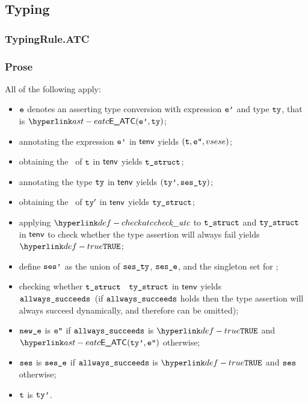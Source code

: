 \begin{mathpar}
\end{mathpar}

\subsection{Typing}
\subsubsection{TypingRule.ATC\label{sec:TypingRule.ATC}}
\subsubsection{Prose}
All of the following apply:
\begin{itemize}
  \item $\ve$ denotes an asserting type conversion with expression $\vep$ and type $\tty$, that is $\EATC(\vep, \tty)$;
  \item annotating the expression $\vep$ in $\tenv$ yields $(\vt, \vepp, \\vsese)$\ProseOrTypeError;
  \item obtaining the \structure\ of $\vt$ in $\tenv$ yields $\vtstruct$\ProseOrTypeError;
  \item annotating the type $\tty$ in $\tenv$ yields $(\ttyp, \vsesty)$\ProseOrTypeError;
  \item obtaining the \structure\ of $\tty'$ in $\tenv$ yields $\vtystruct$\ProseOrTypeError;
  \item applying $\checkatc$ to $\vtstruct$ and $\vtystruct$ in $\tenv$ to check whether the type assertion
        will always fail yields $\True$\ProseOrTypeError;
  \item define $\vsesp$ as the union of $\vsesty$, $\vsese$, and the singleton set for \PerformsAssertions;
  \item checking whether $\vtstruct$ \subtypesatisfies\ $\vtystruct$ in $\tenv$ yields \\
        $\vallwayssucceeds$\ProseOrTypeError\
        (if $\vallwayssucceeds$ holds then the type assertion will always succeed dynamically, and therefore can be omitted);
  \item $\newe$ is $\vepp$ if $\vallwayssucceeds$ is $\True$ and $\EATC(\ttyp, \vepp)$ otherwise;
  \item $\vses$ is $\vsese$ if $\vallwayssucceeds$ is $\True$ and $\vses$ otherwise;
  \item $\vt$ is $\ttyp$.
\end{itemize}
